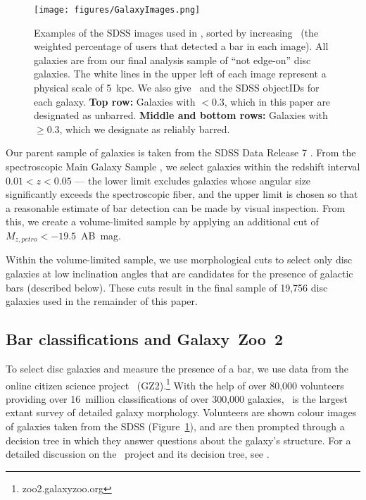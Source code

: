 \begin{figure}
\centering
\texttt{[image: figures/GalaxyImages.png]}
\caption{Examples of the SDSS images used in \gztwo, sorted by increasing \pbar~(the weighted percentage of users that detected a bar in each image). All galaxies are from our final analysis sample of ``not edge-on'' disc galaxies. The white lines in the upper left of each image represent a physical scale of 5~kpc. We also give \pbar~and the SDSS objectIDs for each galaxy. \textbf{Top row:} Galaxies with \pbar$<0.3$, which in this paper are designated as unbarred. \textbf{Middle and bottom rows:} Galaxies with \pbar$\ge0.3$, which we designate as reliably barred.}
\label{gal}
\end{figure}

Our parent sample of galaxies is taken from the SDSS Data Release 7 \citep{Abazajian2009}. From the spectroscopic Main Galaxy Sample \citep{Strauss2002}, we select galaxies within the redshift interval $0.01<z<0.05$ --- the lower limit excludes galaxies whose angular size significantly exceeds the spectroscopic fiber, and the upper limit is chosen so that a reasonable estimate of bar detection can be made by visual inspection. From this, we create a volume-limited sample by applying an additional cut of $M_{z,petro} < -19.5$~AB~mag. 

Within the volume-limited sample, we use morphological cuts to select only disc galaxies at low inclination angles that are candidates for the presence of galactic bars (described below). These cuts result in the final sample of 19,756 disc galaxies used in the remainder of this paper. 

\subsection{Bar classifications and Galaxy~Zoo~2}
To select disc galaxies and measure the presence of a bar, we use data from the online citizen science project \gztwo~(GZ2).\footnote{zoo2.galaxyzoo.org} With the help of over 80,000 volunteers providing over 16~million classifications of over 300,000 galaxies, \gztwo~is the largest extant survey of detailed galaxy morphology. Volunteers are shown colour images of galaxies taken from the SDSS (Figure~\ref{gal}), and are then prompted through a decision tree in which they answer questions about the galaxy's structure. For a detailed discussion on the \gztwo~project and its decision tree, see \citet{Willett2013}.



